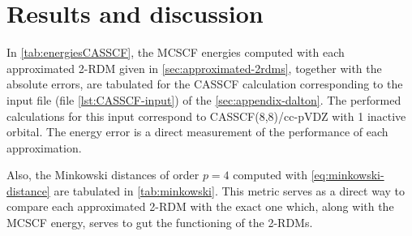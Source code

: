     \section{Results and discussion} %
    \label{sec:results}
    In \cref{tab:energiesCASSCF}, the MCSCF energies computed with each approximated
    2-RDM given in \cref{sec:approximated-2rdms}, together with the absolute
    errors, are tabulated for the CASSCF calculation corresponding to the input file
    (file \ref{lst:CASSCF-input}) of the \cref{sec:appendix-dalton}.
    The performed calculations for this input correspond to CASSCF(8,8)/cc-pVDZ
    with 1 inactive orbital.
    The energy error is a direct measurement of the performance of each approximation.

    Also, the Minkowski distances of order $p=4$ computed with \cref{eq:minkowski-distance}
    are tabulated in \cref{tab:minkowski}.
    This metric serves as a direct way to compare each approximated 2-RDM with the
    exact one which, along with the MCSCF energy, serves to gut the functioning of
    the 2-RDMs.

